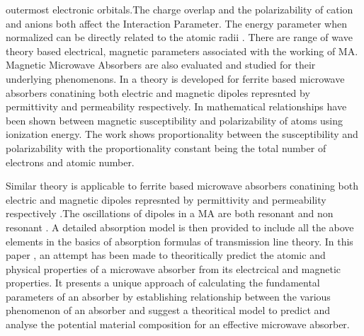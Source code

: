 \documentclass[journal]{IEEEtran}
\begin{document}
outermost electronic orbitals.The charge overlap and the polarizability of cation and anions both affect the Interaction Parameter.
The energy parameter when normalized can be directly related to the atomic radii \cite{korablev2018calculations}. There are range of wave theory based electrical, magnetic parameters associated with the working of MA. Magnetic Microwave Absorbers are also evaluated and studied for their underlying phenomenons. In  \cite{liu2018systemized} a theory is developed for ferrite based microwave absorbers conatining both electric and magnetic dipoles represnted by  permittivity and permeability respectively. In \cite{patil1985susceptibility} mathematical  relationships have been shown  between magnetic susceptibility and polarizability of atoms using ionization energy. The work shows proportionality between the susceptibility and polarizability with the proportionality constant being the total number of electrons and atomic number.

Similar theory is applicable to ferrite based microwave absorbers conatining both electric and magnetic dipoles represnted by  permittivity and permeability respectively \cite{liu2018systemized}.The oscillations of dipoles in a MA are both resonant and non resonant . A detailed absorption model is then provided to include all the above elements in the basics of absorption formulas of transmission line theory.
In this paper , an attempt has been made to theoritically predict the atomic and physical properties of a microwave absorber from its electrcical and magnetic properties. It presents a unique approach of calculating the fundamental parameters of an absorber by establishing relationship between the various phenomenon of an absorber and suggest a theoritical model to predict and analyse the potential material composition for an effective microwave absorber.
\end{document}
